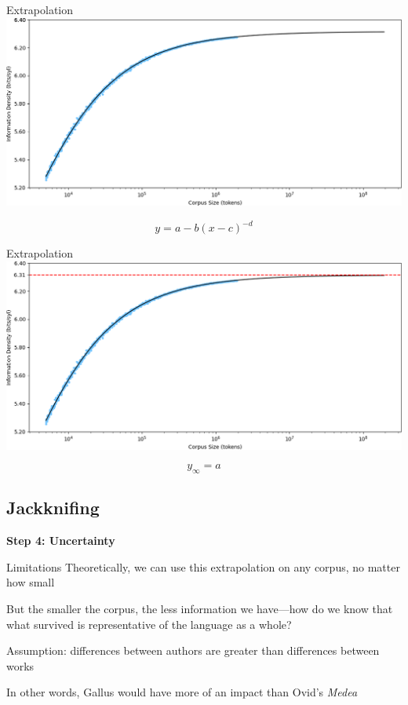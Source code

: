 \documentclass{beamer}
\begin{document}
\begin{frame}{Extrapolation}
\includegraphics[width=\linewidth]{demo2}

\[y=a-b(x-c)^{-d}\]
\end{frame}

\begin{frame}{Extrapolation}
\includegraphics[width=\linewidth]{demo3}

\[y_{\infty}=a\]
\end{frame}

\subsection{Jackknifing}

\begin{frame}{}
\begin{center}
\textbf{\Large Step 4: Uncertainty}
\end{center}
\end{frame}

\begin{frame}{Limitations}
Theoretically, we can use this extrapolation on any corpus, no matter how small

But the smaller the corpus, the less information we have---how do we know that what survived is representative of the language as a whole?

Assumption: differences between authors are greater than differences between works

In other words, Gallus would have more of an impact than Ovid's \emph{Medea}
\end{frame}
\end{document}
